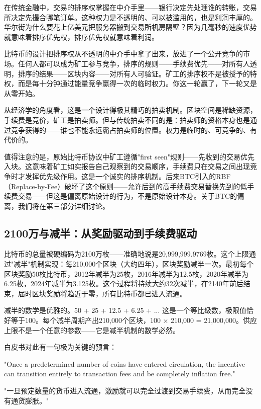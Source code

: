 \documentclass[a4paper,12pt,openany]{ctexbook}
\newenvironment{quoting}{%
  \par\vspace{0.5em}%
  \begin{list}{}{%
    \setlength{\leftmargin}{2em}%
    \setlength{\rightmargin}{2em}%
    \setlength{\parsep}{0.3em}%
    \setlength{\itemsep}{0pt}%
    \setlength{\topsep}{0pt}%
  }%
  \item\relax
}{%
  \end{list}%
  \par\vspace{0.5em}%
}
\begin{document}
在传统金融中，交易的排序权掌握在中介手里——银行决定先处理谁的转账，交易所决定先撮合哪笔订单。这种权力是不透明的、可以被滥用的，也是利润丰厚的。华尔街为什么要花上亿美元把服务器搬到交易所机房隔壁？因为几毫秒的速度优势就意味着排序优先权，排序优先权就意味着利润。

比特币的设计把排序权从不透明的中介手中拿了出来，放进了一个公开竞争的市场。任何人都可以成为矿工参与竞争，排序的规则——手续费优先——对所有人透明，排序的结果——区块内容——对所有人可验证。矿工的排序权不是被授予的特权，而是每十分钟通过能量竞争赢得一次的临时权力。你这一轮赢了，下一轮又是从零开始。

从经济学的角度看，这是一个设计得极其精巧的拍卖机制。区块空间是稀缺资源，手续费是竞价，矿工是拍卖师。但与传统拍卖不同的是：拍卖师的资格本身也是通过竞争获得的——谁也不能永远霸占拍卖师的位置。权力是临时的、可竞争的、有代价的。

值得注意的是，原始比特币协议中矿工遵循"first seen"规则——先收到的交易优先入块。这意味着矿工如实报告自己观察到的交易顺序，手续费只在交易之间出现竞争时才发挥优先级作用。这是一个诚实的排序机制。后来BTC引入的RBF（Replace-by-Fee）破坏了这个原则——允许后到的高手续费交易替换先到的低手续费交易——但这是偏离原始设计的行为，不是原始设计本身。关于BTC的偏离，我们将在第三部分详细讨论。


\subsection*{2100万与减半：从奖励驱动到手续费驱动}


比特币的总量被硬编码为2100万枚——准确地说是20,999,999.9769枚。这个上限通过"减半"机制实现：每210,000个区块（大约四年），区块奖励减半一次。最初每个区块奖励50枚比特币，2012年减半为25枚，2016年减半为12.5枚，2020年减半为6.25枚，2024年减半为3.125枚。这个过程将持续大约32次减半，在2140年前后结束，届时区块奖励将趋近于零，所有比特币都已进入流通。

减半的数学是优雅的。50 + 25 + 12.5 + 6.25 + ... 这是一个等比级数，极限值恰好等于100。每个减半周期产出210,000个区块，100 × 210,000 = 21,000,000。供应上限不是一个任意的参数——它是减半机制的数学必然。

白皮书对此有一句极为关键的预言：


\begin{quoting}
\small
"Once a predetermined number of coins have entered circulation, the incentive can transition entirely to transaction fees and be completely inflation free."

"一旦预定数量的货币进入流通，激励就可以完全过渡到交易手续费，从而完全没有通货膨胀。"
\end{quoting}
\end{document}
